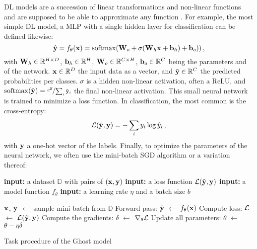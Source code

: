 \ac{DL} models are a succession of linear transformations and non-linear functions and are supposed
to be able to approximate any function . For example, the most simple \ac{DL}
model, a \ac{MLP} with a single hidden layer for classification can be defined likewise:
%
\begin{equation}
      \hat{\mathbf{y}} = f_\theta(\mathbf{x}) = \operatorname{softmax}(\mathbf{W}_o + \sigma(\mathbf{W}_h \mathbf{x} + \mathbf{b}_h) + \mathbf{b}_o))\,,
      \label{eq:intro_mlp}
\end{equation}
%
with $\mathbf{W}_h \in \mathbb{R}^{H \times D}$, $\mathbf{b}_h \in \mathbb{R}^{H}$,
$\mathbf{W}_o \in \mathbb{R}^{C \times H}$, $\mathbf{b}_o \in \mathbb{R}^{C}$ being the parameters and of the network.
$\mathbf{x} \in \mathbb{R}^D$ the input data as a vector, and $\tilde{\mathbf{y}} \in \mathbb{R}^C$ the predicted
probabilities per classes. $\sigma$ is a hidden non-linear activation, often a \ac{ReLU}, and
$\operatorname{softmax}(\tilde{\mathbf{y}}) = \nicefrac{e^{\tilde{\mathbf{y}}}}{\sum_{i} \tilde{\mathbf{y}}_i}$ the final
non-linear activation. This small neural network is trained to minimize a loss function. In
classification, the most common is the cross-entropy:
%
\begin{equation}
      \mathcal{L}(\hat{\mathbf{y}}, \mathbf{y}) = -\sum_i y_i \log \hat{y}_i\,,
      \label{eq:intro_ce}
\end{equation}
%
with $\mathbf{y}$ a one-hot vector of the labels. Finally, to optimize the parameters of the neural
network, we often use the mini-batch \ac{SGD} algorithm or a variation thereof:

\begin{algorithm}
      \begin{algorithmic}[1]
            \Statex \textbf{input:} a dataset $\mathbb{D}$ with pairs of $(\mathbf{x}, \mathbf{y})$
            \Statex \textbf{input:} a loss function $\mathcal{L}(\hat{\mathbf{y}}, \mathbf{y})$
            \Statex \textbf{input:} a model function $f_\theta$
            \Statex \textbf{input:} a learning rate $\eta$ and a batch size $b$
            \Statex

            \State $\mathbf{x}$, $\mathbf{y}$ $\gets$ sample mini-batch from $\mathbb{D}$
            \State Forward pass: $\hat{\mathbf{y}}$ $\gets$ $f_\theta(\mathbf{x})$
            \State Compute loss: $\mathcal{L}$ $\gets$ $\mathcal{L}(\hat{\mathbf{y}}, \mathbf{y})$
            \State Compute the gradients: $\delta$ $\gets$ $\nabla_\theta \mathcal{L}$
            \State Update all parameters: $\theta$ $\gets$ $\theta - \eta \delta$
            \EndWhile
      \end{algorithmic}
      \caption{Task procedure of the Ghost model}
      \label{algo:intro_sgd}
\end{algorithm}


